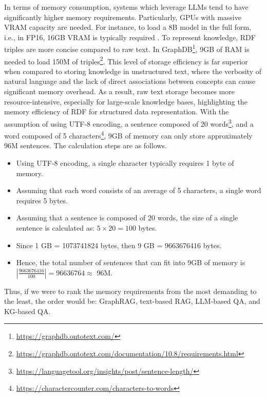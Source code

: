 In terms of memory consumption, systems which leverage LLMs tend to
have significantly higher memory requirements. Particularly, GPUs with
massive VRAM capacity are needed. For instance, to load a 8B model in
the full form, i.e., in FP16, 16GB VRAM is typically required \citep{huggingface_llama31}.
To represent knowledge, RDF triples are more concise compared to raw text.
In GraphDB\footnote{\url{https://graphdb.ontotext.com/}}, 9GB of RAM is needed
to load 150M of triples\footnote{\url{https://graphdb.ontotext.com/documentation/10.8/requirements.html}}.
This level of storage efficiency is far superior when compared to 
storing knowledge in unstructured text, where the verbosity of natural 
language and the lack of direct associations between concepts can cause 
significant memory overhead. As a result, raw text storage becomes more 
resource-intensive, especially for large-scale knowledge bases, 
highlighting the memory efficiency of RDF for structured data 
representation. With the assumption of using UTF-8 encoding, a sentence composed of 20 words\footnote{\url{https://languagetool.org/insights/post/sentence-length/}}, and
a word composed of 5 characters\footnote{\url{https://charactercounter.com/characters-to-words}}, 9GB of memory can only store approximately
96M sentences. The calculation steps are as follows.
\begin{itemize}
    \item Using UTF-8 encoding, a single character typically requires 1 byte of memory.
    \item Assuming that each word consists of an average of 5 characters, a single word requires 5 bytes.
    \item Assuming that a sentence is composed of 20 words, the size of a single sentence is calculated as: $5 \times 20=100$ bytes.
    \item Since 1 GB = 1073741824 bytes, then 9 GB = 9663676416 bytes.
    \item Hence, the total number of sentences that can fit into 9GB of memory is $\left|\frac{9663676416}{100}\right|=96636764\approx$ 96M.
\end{itemize}

Thus, if we were to rank the memory requirements from the most 
demanding to the least, the order would be: GraphRAG, text-based RAG, 
LLM-based QA, and KG-based QA.

